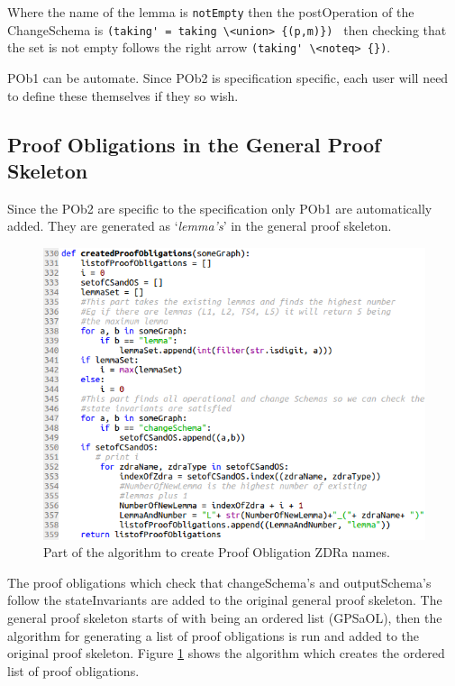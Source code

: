 Where the name of the lemma is \verb|notEmpty| then the postOperation of the ChangeSchema is \verb|(taking' = taking \<union> {(p,m)}) | then checking that the set is not empty follows the right arrow \verb|(taking' \<noteq> {})|.

POb1 can be automate. Since POb2 is specification specific, each user will need to define these themselves if they so wish.

\subsection{Proof Obligations in the General Proof Skeleton}

Since the POb2 are specific to the specification only POb1 are automatically added. They are generated as `\emph{lemma's}' in the general proof skeleton. 

\begin{figure}[H]
\includegraphics[scale=0.6]{Figures/skeleton/pobcode.png}
\caption{Part of the algorithm to create Proof Obligation ZDRa names.}
\label{fig:codepob}
\end{figure}

The proof obligations which check that changeSchema's and outputSchema's follow the stateInvariants are added to the original general proof skeleton. The general proof skeleton starts of with being an ordered list (GPSaOL), then the algorithm for generating a list of proof obligations is run and added to the original proof skeleton. Figure \ref{fig:codepob} shows the algorithm which creates the ordered list of proof obligations.

